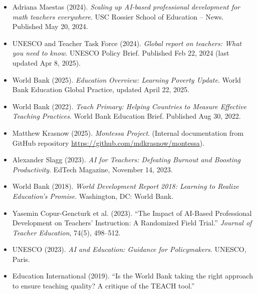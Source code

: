 \documentclass[12pt]{article}
\begin{document}
\begin{itemize}
\item Adriana Maestas (2024). \textit{Scaling up AI-based professional development for math teachers everywhere}. USC Rossier School of Education – News. Published May 20, 2024.
\item UNESCO and Teacher Task Force (2024). \textit{Global report on teachers: What you need to know}. UNESCO Policy Brief. Published Feb 22, 2024 (last updated Apr 8, 2025).
\item World Bank (2025). \textit{Education Overview: Learning Poverty Update}. World Bank Education Global Practice, updated April 22, 2025.
\item World Bank (2022). \textit{Teach Primary: Helping Countries to Measure Effective Teaching Practices}. World Bank Education Brief. Published Aug 30, 2022.
\item Matthew Krasnow (2025). \textit{Montessa Project}. (Internal documentation from GitHub repository \url{https://github.com/mdkrasnow/montessa}).
\item Alexander Slagg (2023). \textit{AI for Teachers: Defeating Burnout and Boosting Productivity}. EdTech Magazine, November 14, 2023.
\item World Bank (2018). \textit{World Development Report 2018: Learning to Realize Education’s Promise}. Washington, DC: World Bank.
\item Yasemin Copur-Gencturk et al. (2023). “The Impact of AI-Based Professional Development on Teachers’ Instruction: A Randomized Field Trial.” \textit{Journal of Teacher Education}, 74(5), 498–512.
\item UNESCO (2023). \textit{AI and Education: Guidance for Policymakers}. UNESCO, Paris.
\item Education International (2019). “Is the World Bank taking the right approach to ensure teaching quality? A critique of the TEACH tool.”
\end{itemize}
\end{document}
